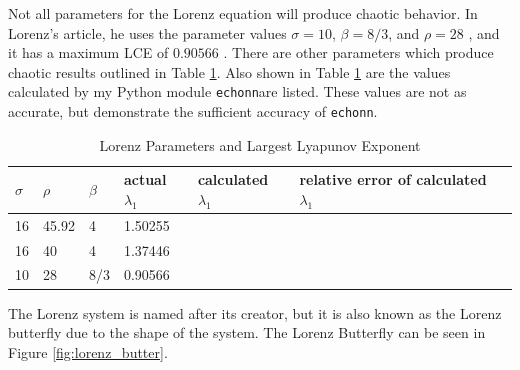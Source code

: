 \documentclass{article}
\newcommand{\echonn}{\texttt{echonn}}
\begin{document}
Not all parameters for the Lorenz equation will produce chaotic behavior. In
Lorenz's article, he uses the parameter values $\sigma=10$, $\beta=8/3$, and
$\rho=28$ \cite{lorenz1963deterministic}, and it has a maximum LCE of
$0.90566$ \cite{viswanath1998lyapunov}. There are other parameters which
produce chaotic results outlined in Table \ref{table:lorenz_params}. Also
shown in Table \ref{table:lorenz_params} are the values calculated by my
Python module \echonn are listed. These values are not as accurate,
but demonstrate the sufficient accuracy of \echonn.

\begin{table}[H]
    \centering
    \begin{tabular}{|l|l|l|l|l|l|l|}
        \hline
        $\sigma$ & $\rho$ & $\beta$ & actual $\lambda_1$ & calculated $\lambda_1$ & relative error of calculated $\lambda_1$ \\
        \hline \hline
        16 & 45.92 & 4 & 1.50255 & & \\ %
        16 & 40 & 4 & 1.37446 & & \\
        10 & 28 & 8/3 & 0.90566 & & \\
        \hline
    \end{tabular}
    \caption{
        Lorenz Parameters and Largest Lyapunov Exponent
        \cite{viswanath1998lyapunov}
    }
    \label{table:lorenz_params}
\end{table}

The Lorenz system is named after its creator, but it is also known as the
Lorenz butterfly due to the shape of the system. The Lorenz
Butterfly can be seen in Figure \ref{fig:lorenz_butter}.
\end{document}
